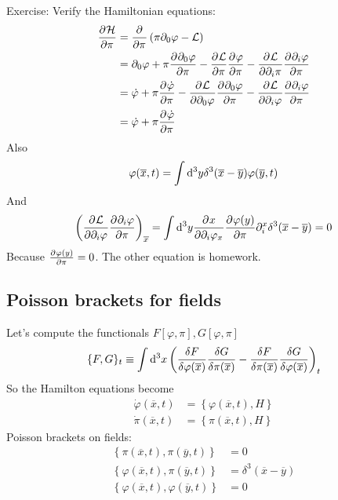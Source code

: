\begin{example}
Exercise: Verify the Hamiltonian equations:
\begin{align*}
 \frac{\partial{^{}}\mathcal{H}}{\partial{{\pi}^{}}}  &=  \frac{\partial{^{}}}{\partial{{\pi}^{}}} \left(\pi\partial_0\varphi - \mathcal{L}\right) \\
&= \partial_0\varphi + \pi  \frac{\partial{^{}}\partial_0\varphi}{\partial{{\pi}^{}}}  -  \frac{\partial{^{}}\mathcal{L}}{\partial{{\pi}^{}}}  \frac{\partial{^{}}\varphi}{\partial{{\pi}^{}}}  -  \frac{\partial{^{}}\mathcal{L}}{\partial{{\partial_i\pi}^{}}}  \frac{\partial{^{}}\partial_i\varphi}{\partial{{\pi}^{}}}  \\
&= \dot{\varphi} + \pi  \frac{\partial{^{}}\dot{\varphi}}{\partial{{\pi}^{}}}  -  \frac{\partial{^{}}\mathcal{L}}{\partial{{\partial_0\varphi}^{}}}  \frac{\partial{^{}}\partial_0\varphi}{\partial{{\pi}^{}}}  -  \frac{\partial{^{}}\mathcal{L}}{\partial{{\partial_i\varphi}^{}}}  \frac{\partial{^{}}\partial_i\varphi}{\partial{{\pi}^{}}}  \\
&= \dot{\varphi} + \pi  \frac{\partial{^{}}\dot{\varphi}}{\partial{{\pi}^{}}} 
\end{align*}
Also
\[ \varphi(\overline{x},t) = \int \operatorname{d \!}{^3y}\delta^3(\overline{x}- \overline{y})\varphi(\overline{y},t) \]
And
\[ \left( \frac{\partial{^{}}\mathcal{L}}{\partial{{\partial_i\varphi}^{}}}  \frac{\partial{^{}}\partial_i\varphi}{\partial{{\pi}^{}}} \right)_{\overline{x}} = \int \operatorname{d \!}{^3y} \frac{\partial{^{}}x}{\partial{{\partial_i\varphi_x}^{}}}  \frac{\partial{^{}}\varphi(y)}{\partial{{\pi}^{}}} \partial_i^x\delta^3(\overline{x}- \overline{y}) = 0 \]
Because $ \frac{\partial{^{}}\varphi(y)}{\partial{{\pi}^{}}}  = 0$.
The other equation is homework.
\end{example}

\subsection{Poisson brackets for fields}

Let's compute the functionals $F[\varphi,\pi], G[\varphi, \pi]$
\[ \{ F,G \}_t \equiv  \int \operatorname{d \!}{^3x} \left(\frac{\delta F}{\delta \varphi(\overline{x})}\frac{\delta G}{\delta \pi (\overline{x})}- \frac{\delta F}{\delta \pi(\overline{x})}\frac{\delta G}{\delta \varphi(\overline{x})}\right)_t\]
So the Hamilton equations become
\begin{align*} \dot{\varphi}(\overline{x},t) &= \left\{\varphi(\overline{x},t), H\right\} \\
 \dot{\pi}(\overline{x},t) &= \left\{\pi(\overline{x},t), H\right\} \end{align*}
Poisson brackets on fields:
\begin{align*}
\left\{\pi(\overline{x},t), \pi(\overline{y},t)\right\} &= 0 \\
\left\{\varphi(\overline{x},t), \pi(\overline{y},t)\right\} &= \delta^3(\overline{x}- \overline{y}) \\
\left\{\varphi(\overline{x},t), \varphi(\overline{y},t)\right\} &= 0 
\end{align*}

